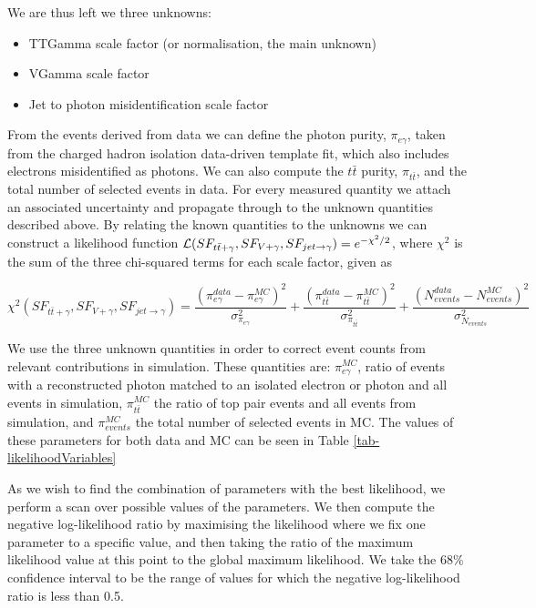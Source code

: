 We are thus left we three unknowns:

\begin{itemize}
	\item TTGamma scale factor (or normalisation, the main unknown) 
	\item VGamma scale factor
	\item Jet to photon misidentification scale factor
\end{itemize}

From the events derived from data we can define the photon purity, $\pi_{e\gamma}$, taken from the charged hadron isolation data-driven template fit, which also includes electrons misidentified as photons. We can also compute the $t\bar{t}$ purity, $\pi_{t\bar{t}}$, and the total number of selected events in data. For every measured quantity we attach an associated uncertainty and propagate through to the unknown quantities described above. By relating the known quantities to the unknowns we can construct a likelihood function $\mathcal{L}(SF_{t\bar{t}+\gamma},SF_{V+\gamma},SF_{jet\to\gamma}) = e^{-\chi^2/2}$, where $\chi^2$ is the sum of the three chi-squared terms for each scale factor, given as   

\begin{equation}
\chi^2(SF_{t\bar{t}+\gamma},SF_{V+\gamma},SF_{jet\to\gamma}) = \frac{\left(\pi^{data}_{e\gamma} - \pi^{MC}_{e\gamma}\right)^2}{\sigma^2_{\pi_{e\gamma}}} + \frac{\left(\pi^{data}_{t\bar{t}} - \pi^{MC}_{t\bar{t}}\right)^2}{\sigma^2_{\pi_{t\bar{t}}}} + \frac{\left(N^{data}_{events} - N^{MC}_{events}\right)^2}{\sigma^2_{N_{events}}}
\end{equation}

We use the three unknown quantities in order to correct event counts from relevant contributions in simulation. These quantities are: $\pi_{e\gamma}^{MC}$, ratio of events with a reconstructed photon matched to an isolated electron or photon and all events in simulation, $\pi_{t\bar{t}}^{MC}$ the ratio of top pair events and all events from simulation, and $\pi_{events}^{MC}$ the total number of selected events in MC. The values of these parameters for both data and MC can be seen in Table \ref{tab-likelihoodVariables}	

As we wish to find the combination of parameters with the best likelihood, we perform a scan over possible values of the parameters. We then compute the negative log-likelihood ratio by maximising the likelihood where we fix one parameter to a specific value, and then taking the ratio of the maximum likelihood value at this point to the global maximum likelihood. We take the 68\% confidence interval to be the range of values for which the negative log-likelihood ratio is less than 0.5.

